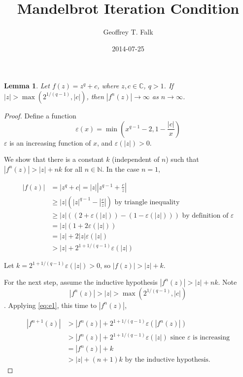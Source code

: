 \documentclass[11pt]{article}
\date{2014-07-25}
\author{Geoffrey T. Falk}
\title{Mandelbrot Iteration Condition}
\begin{document}

\maketitle

\newtheorem*{lemma}{Lemma}

\begin{lemma}
Let $f(z) = z^q + c$, where $z, c \in \mathbb C$, $q > 1$.
If $|z| > \max(2^{1/(q-1)}, |c|)$, then
$|f^n(z)| \rightarrow \infty$ as $n \rightarrow \infty$.
\end{lemma}

\begin{proof}
Define a function $$\varepsilon(x) = \min\left(x^{q-1} - 2, 1 - \frac{|c|}{x}\right)$$
$\varepsilon$ is an increasing function of $x$, and $\varepsilon(|z|) > 0$.

We show that there is a constant $k$ (independent of $n$) such that 
$|f^n(z)| > |z| + n k$ for all $n \in \mathbb N$. In the case $n = 1$,

\begin{equation} \label{eq:e1}
\begin{aligned}
|f(z)| &= \left| z^q + c \right| = |z| \left| z^{q-1} + \frac{c}{z} \right| \\
&\geq |z| \left( |z|^{q-1} - {\left|\frac{c}{z}\right|}\right) \text{ by triangle inequality} \\
&\geq |z| \left( \left(2 + \varepsilon(|z|) \right) - \left(1 - \varepsilon(|z|)\right)\right)
 \text{ by definition of $\varepsilon$} \\
&= |z| \left(1 + 2 \varepsilon(|z|) \right) \\
&= |z| + 2 |z| \varepsilon(|z|) \\
&> |z| + 2^{1 + {1/(q-1)}} \varepsilon(|z|)
\end{aligned}
\end{equation}

Let $k = 2^{1 + {1/(q-1)}} \varepsilon(|z|) > 0$, so $|f(z)| > |z| + k$.

For the next step, assume the inductive hypothesis $|f^n(z)| > |z| + n k$.
Note $$|f^n(z)| > |z| > \max(2^{1/(q-1)}, |c|)$$.
Applying \eqref{eq:e1}, this time to $|f^n(z)|$,

\begin{equation} \label{eq:e2}
\begin{aligned}
\left|f^{n+1}(z)\right| 
&> \left|f^n(z)\right| +  2^{1 + {1/(q-1)}} \varepsilon(\left|f^n(z)\right|) \\
&> \left|f^n(z)\right| + 2^{1 + {1/(q-1)}} \varepsilon(|z|) \text{ since $\varepsilon$ is increasing} \\
&= \left|f^n(z)\right| + k \\
&> |z| + (n+1)k \text{ by the inductive hypothesis.}
\end{aligned}
\end{equation}
\end{proof}
\end{document}
